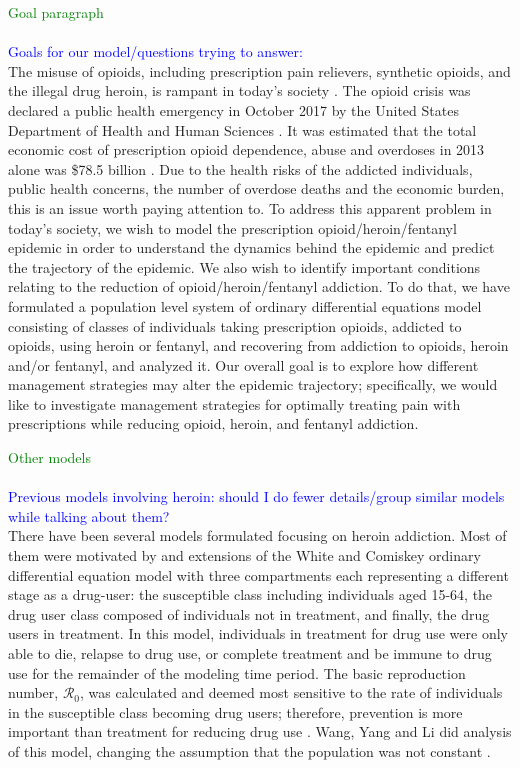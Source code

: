 \documentclass[12pt]{article}
\begin{document}
\textcolor{green}{Goal paragraph} \\ \\
\textcolor{blue}{Goals for our model/questions trying to answer:} \\
The misuse of opioids, including prescription pain relievers, synthetic opioids, and the illegal drug heroin, is rampant in today's society \cite{NIH2}. The opioid crisis was declared a public health emergency in October 2017 by the United States Department of Health and Human Sciences \cite{HHS1}. It was estimated that the total economic cost of prescription opioid dependence, abuse and overdoses in 2013 alone was \$78.5 billion \cite{Florence}. Due to the health risks of the addicted individuals, public health concerns, the number of overdose deaths and the economic burden, this is an issue worth paying attention to.
To address this apparent problem in today's society, we wish to model the prescription opioid/heroin/fentanyl epidemic in order to understand the dynamics behind the epidemic and predict the trajectory of the epidemic. We also wish to identify important conditions relating to the reduction of opioid/heroin/fentanyl addiction. To do that, we have formulated a population level system of ordinary differential equations model consisting of classes of individuals taking prescription opioids, addicted to opioids, using heroin or fentanyl, and recovering from addiction to opioids, heroin and/or fentanyl, and analyzed it. Our overall goal is to explore how different management strategies may alter the epidemic trajectory; specifically, we would like to investigate management strategies for optimally treating pain with prescriptions while reducing opioid, heroin, and fentanyl addiction.

\textcolor{green}{Other models} \\ \\
\textcolor{blue}{Previous models involving heroin: should I do fewer details/group similar models while talking about them?} \\
There have been several models formulated focusing on heroin addiction. Most of them were motivated by and extensions of the White and Comiskey ordinary differential equation model with three compartments each representing a different stage as a drug-user: the susceptible class including individuals aged 15-64, the drug user class composed of individuals not in treatment, and finally, the drug users in treatment. In this model, individuals in treatment for drug use were only able to die, relapse to drug use, or complete treatment and be immune to drug use for the remainder of the modeling time period. The basic reproduction number, $\mathscr{R}_0$, was calculated and deemed most sensitive to the rate of individuals in the susceptible class becoming drug users; therefore, prevention is more important than treatment for reducing drug use \cite{White}. Wang, Yang and Li did analysis of this model, changing the assumption that the population was not constant \cite{Wang}. 
\end{document}
